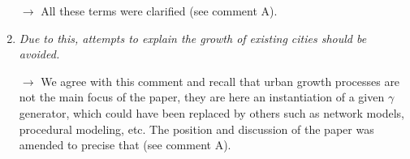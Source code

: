 \documentclass[11pt,a4paper,sans]{moderncv}        %
\begin{document}
\begin{enumerate}
  $\rightarrow$ All these terms were clarified (see comment A). 

  \medskip

  \item \textit{Due to this, attempts to explain the growth of existing cities should be avoided.}
  
  $\rightarrow$ We agree with this comment and recall that urban growth processes are not the main focus of the paper, they are here an instantiation of a given $\gamma$ generator, which could have been replaced by others such as network models, procedural modeling, etc. The position and discussion of the paper was amended to precise that (see comment A).
  
 
  \medskip
 

\end{enumerate}
\end{document}
